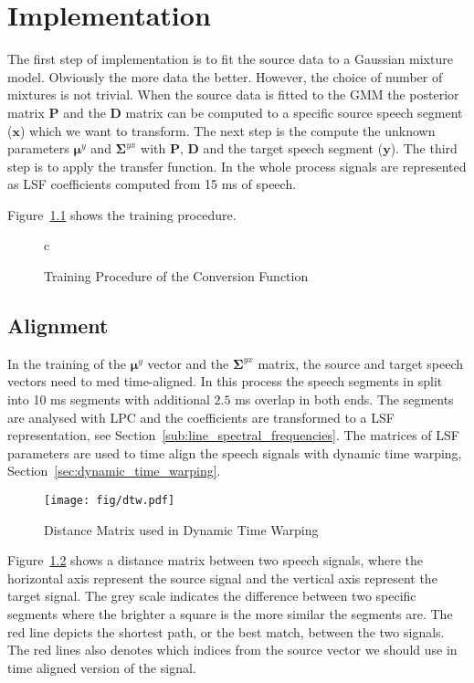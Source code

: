 \chapter{Implementation} %
\label{cha:implementation}
The first step of implementation is to fit the source data to a Gaussian mixture model. Obviously the more data the better. However, the choice of number of mixtures is not trivial. When the source data is fitted to the GMM the posterior matrix $\mathbf{P}$ and the $\mathbf{D}$ matrix can be computed to a specific source speech segment ($\mathbf{x}$) which we want to transform. The next step is the compute the unknown parameters $\boldsymbol{\mu}^y$ and $\mathbf{\Sigma}^{yx}$ with $\mathbf{P}$, $\mathbf{D}$ and the target speech segment ($\mathbf{y}$). The third step is to apply the transfer function. In the whole process signals are represented as LSF coefficients computed from 15 ms of speech.

Figure~\ref{fig:training_cf} shows the training procedure.
\begin{figure}[htbp]
  \centering
   \begin{tabular}[h]{c}
  \end{tabular}
  \caption{Training Procedure of the Conversion Function}
  \label{fig:training_cf}
\end{figure}

\section{Alignment} %
\label{sec:alignment}
In the training of the $\boldsymbol{\mu}^y$ vector and the $\mathbf{\Sigma}^{yx}$ matrix, the source and target speech vectors need to med time-aligned. In this process the speech segments in split into 10 ms segments with additional $2.5$ ms overlap in both ends. The segments are analysed with LPC and the coefficients are transformed to a LSF representation, see Section~\ref{sub:line_spectral_frequencies}. The matrices of LSF parameters are used to time align the speech signals with dynamic time warping, Section~\ref{sec:dynamic_time_warping}.

\begin{figure}[htbp]
	\begin{center}
		\texttt{[image: fig/dtw.pdf]}
		\caption{Distance Matrix used in Dynamic Time Warping}
		\label{fig:dtw}
	\end{center}
\end{figure}
Figure~\ref{fig:dtw} shows a distance matrix between two speech signals, where the horizontal axis represent the source signal and the vertical axis represent the target signal. The grey scale indicates the difference between two specific segments where the brighter a square is the more similar the segments are. The red line depicts the shortest path, or the best match, between the two signals. The red lines also denotes which indices from the source vector we should use in time aligned version of the signal.


